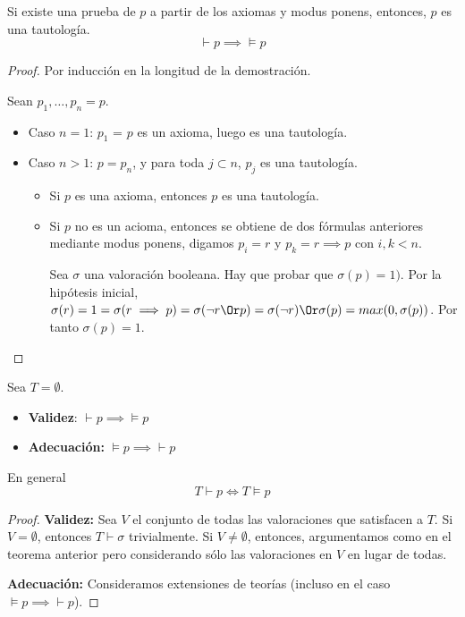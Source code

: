 \begin{theorem}
	Si existe una prueba de $p$ a partir de los axiomas y modus ponens, entonces, $p$ es una tautología.
	$$\vdash p \implies \vDash p$$
\end{theorem}
\begin{proof}
	Por inducción en la longitud de la demostración. 
	
	Sean $p_1,\hdots, p_n=p$.
	\begin{itemize}
		\item Caso $n=1$: $p_1$ = $p$ es un axioma, luego es una tautología.
		\item Caso $n>1$: $p=p_n$, y para toda $j\subset n$, $p_j$ es una tautología.
		\begin{itemize}
			\item Si $p$ es una axioma, entonces $p$ es una tautología.
			\item Si $p$ no es un acioma, entonces se obtiene de dos fórmulas anteriores mediante modus ponens, digamos $p_i = r$ y $p_k=r\implies p$ con $i,k<n$. 
			
			Sea $\sigma$ una valoración booleana. Hay que probar que $\sigma(p) = 1)$. Por la hipótesis inicial, $\sigma(r) = 1 = \sigma(r\implies p) = \sigma(\neg r \Or p) = \sigma(\neg r) \Or \sigma(p) = max(0,\sigma(p))$.
			Por tanto $\sigma(p) = 1$.
		\end{itemize}
	\end{itemize}
\end{proof}

\begin{theorem}	Sea $T = \emptyset$.
	\begin{itemize}
		\item \textbf{Validez}: 
		$\vdash p \implies \vDash p$
		\item \textbf{Adecuación:}
		$\vDash p \implies \vdash p$
	\end{itemize}
	En general $$T\vdash p \iff T\vDash p$$
\end{theorem}
\begin{proof}
	
	\textbf{Validez:} Sea $V$ el conjunto de todas las valoraciones que satisfacen a $T$. Si $V=\emptyset$, entonces $T\vdash \sigma$ trivialmente. Si $V\neq \emptyset$, entonces, argumentamos como en el teorema anterior pero considerando sólo las valoraciones en $V$ en lugar de todas.
	
	\textbf{Adecuación:} Consideramos extensiones de teorías (incluso en el caso $\vDash p \implies \vdash p$).
	
\end{proof}

